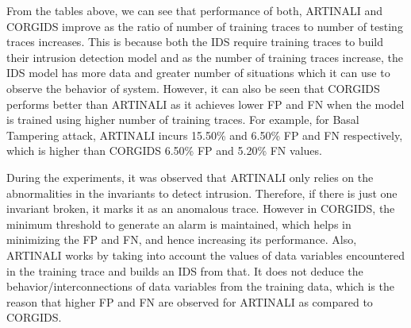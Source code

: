 \begin{table}
\centering
  \caption{Results of intrusion detection by ARTINALI for Basal Tampering attack on SAP platform}
  \label{tab:ARTINALI_SAP_COMP_BASAL}
\end{table}


\begin{table}
\centering
  \caption{Results of intrusion detection by CORGIDS for Insulin Tampering attack on SAP platform}
  \label{tab:CORGIDS_SAP_COMP_INSULIN}
\end{table}

From the tables above, we can see that performance of both, ARTINALI and CORGIDS improve as the ratio of number of training traces to number of testing traces increases. This is because both the IDS require training traces to build their intrusion detection model and as the number of training traces increase, the IDS model has more data and greater number of situations which it can use to observe the behavior of system. However, it can also be seen that CORGIDS performs better than ARTINALI as it achieves lower FP and FN when the model is trained using higher number of training traces. For example, for Basal Tampering attack, ARTINALI incurs 15.50\% and 6.50\% FP and FN respectively, which is higher than CORGIDS 6.50\% FP and 5.20\% FN values. 

During the experiments, it was observed that ARTINALI only relies on the abnormalities in the invariants to detect intrusion. Therefore, if there is just one invariant broken, it marks it as an anomalous trace. However in CORGIDS, the minimum threshold to generate an alarm is maintained, which helps in minimizing the FP and FN, and hence increasing its performance. Also, ARTINALI works by taking into account the values of data variables encountered in the training trace and builds an IDS from that. It does not deduce the behavior/interconnections of data variables from the training data, which is the reason that higher FP and FN are observed for ARTINALI as compared to CORGIDS.

